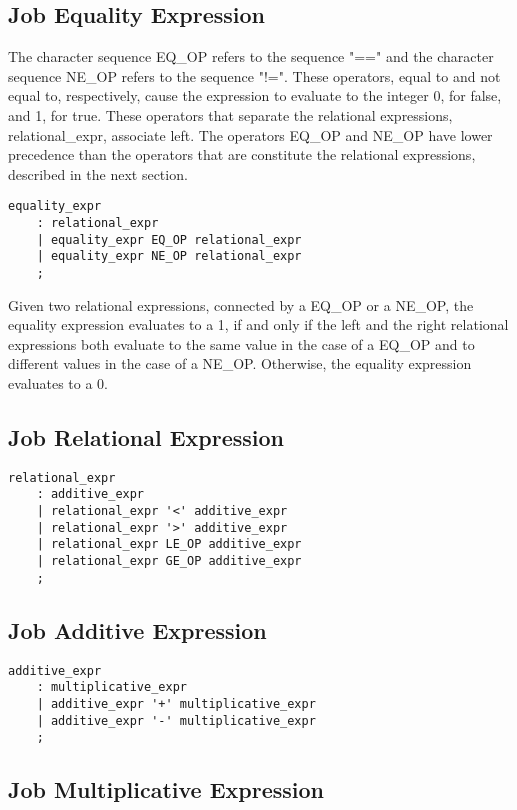 \documentclass[prodmode,acmtecs]{acmsmall}
\begin{document}
\subsection{Job Equality Expression}

The character sequence EQ\_OP refers to the sequence "==" and the character sequence NE\_OP refers to the sequence "!=". These operators, equal to and not equal to, respectively, cause the expression to evaluate to the integer 0, for false, and 1, for true.  These operators that separate the relational expressions, relational\_expr, associate left. The operators EQ\_OP and NE\_OP have lower precedence than the operators that are constitute the relational expressions, described in the next section. 

\begin{lstlisting}
equality_expr
	: relational_expr
	| equality_expr EQ_OP relational_expr
	| equality_expr NE_OP relational_expr
	;
\end{lstlisting}

Given two relational expressions, connected by a EQ\_OP or a NE\_OP, the equality expression evaluates to a 1, if and only if the left and the right relational expressions both evaluate to the same value in the case of a EQ\_OP and to different values in the case of a NE\_OP. Otherwise, the equality expression evaluates to a 0.

\subsection{Job Relational Expression}

\begin{lstlisting}
relational_expr
	: additive_expr
	| relational_expr '<' additive_expr
	| relational_expr '>' additive_expr
	| relational_expr LE_OP additive_expr
	| relational_expr GE_OP additive_expr
	;
\end{lstlisting}

\subsection{Job Additive Expression}

\begin{lstlisting}
additive_expr
	: multiplicative_expr
	| additive_expr '+' multiplicative_expr
	| additive_expr '-' multiplicative_expr
	;
\end{lstlisting}

\subsection{Job Multiplicative Expression}
\end{document}
